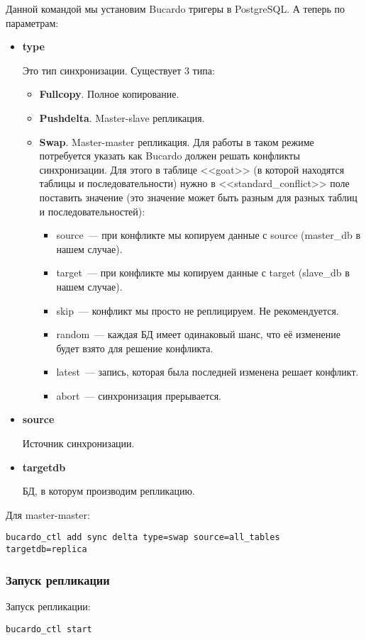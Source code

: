 Данной командой мы установим Bucardo тригеры в PostgreSQL. А теперь по параметрам:
\begin{itemize}
\item \textbf{type}

Это тип синхронизации. Существует 3 типа:
\begin{itemize}
\item \textbf{Fullcopy}. Полное копирование.
\item \textbf{Pushdelta}. Master-slave репликация.
\item \textbf{Swap}. Master-master репликация. 
Для работы в таком режиме потребуется указать как Bucardo должен решать конфликты синхронизации.
Для этого в таблице <<goat>> (в которой находятся таблицы и последовательности) нужно в <<standard\_conflict>> 
поле поставить значение (это значение может быть разным для разных таблиц и последовательностей):
\begin{itemize}
\item source~--- при конфликте мы копируем данные с source (master\_db в нашем случае).
\item target~--- при конфликте мы копируем данные с target (slave\_db в нашем случае).
\item skip~--- конфликт мы просто не реплицируем. Не рекомендуется.
\item random~--- каждая БД имеет одинаковый шанс, что её изменение будет взято для решение конфликта.
\item latest~--- запись, которая была последней изменена решает конфликт.
\item abort~--- синхронизация прерывается.
\end{itemize}
\end{itemize}

\item \textbf{source}

Источник синхронизации.

\item \textbf{targetdb}

БД, в которум производим репликацию.
\end{itemize}

Для master-master:
\begin{verbatim}
bucardo_ctl add sync delta type=swap source=all_tables targetdb=replica
\end{verbatim}

\subsubsection{Запуск репликации}
Запуск репликации:
\begin{verbatim}
bucardo_ctl start
\end{verbatim}

